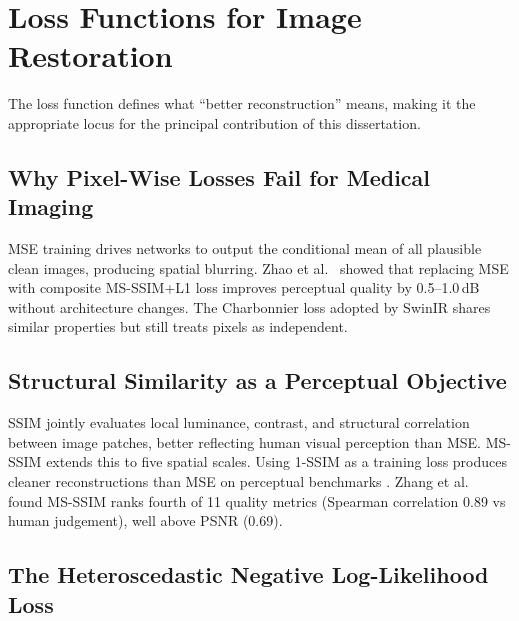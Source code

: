 \documentclass[12pt, a4paper, twoside, openright]{book}
\begin{document}
\section{Loss Functions for Image Restoration}
\label{sec:lit:losses}

The loss function defines what ``better reconstruction'' means, making it the appropriate locus for the principal contribution of this dissertation.

\subsection{Why Pixel-Wise Losses Fail for Medical Imaging}
\label{sec:lit:losses:pixelwise}

MSE training drives networks to output the conditional mean of all plausible clean images, producing spatial blurring. Zhao et al.\ \cite{zhao_loss_2017} showed that replacing MSE with composite MS-SSIM+L1 loss improves perceptual quality by 0.5--1.0\,dB without architecture changes. The Charbonnier loss \cite{charbonnier_two_1994} adopted by SwinIR shares similar properties but still treats pixels as independent.

\subsection{Structural Similarity as a Perceptual Objective}
\label{sec:lit:losses:ssim}

SSIM \cite{wang_image_2004} jointly evaluates local luminance, contrast, and structural correlation between image patches, better reflecting human visual perception than MSE. MS-SSIM \cite{wang_multiscale_2003} extends this to five spatial scales. Using 1-SSIM as a training loss produces cleaner reconstructions than MSE on perceptual benchmarks \cite{zhao_loss_2017}. Zhang et al.\ \cite{zhang_comprehensive_2012} found MS-SSIM ranks fourth of 11 quality metrics (Spearman correlation 0.89 vs human judgement), well above PSNR (0.69).

\subsection{The Heteroscedastic Negative Log-Likelihood Loss}
\label{sec:lit:losses:nll}
\end{document}
